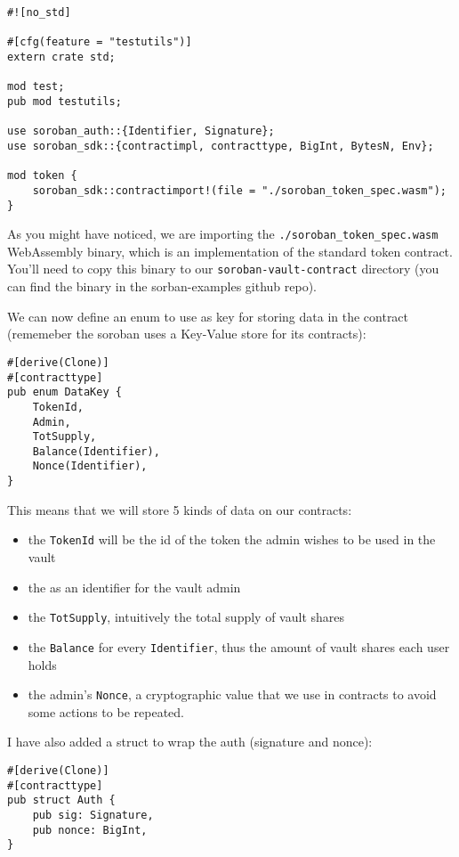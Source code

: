 \documentclass{article}
\newcommand{\inl}[1]{\lstinline{#1}}
\begin{document}
\begin{lstlisting}
#![no_std]

#[cfg(feature = "testutils")]
extern crate std;

mod test;
pub mod testutils;

use soroban_auth::{Identifier, Signature};
use soroban_sdk::{contractimpl, contracttype, BigInt, BytesN, Env};

mod token {
    soroban_sdk::contractimport!(file = "./soroban_token_spec.wasm");
}

\end{lstlisting}

As you might have noticed, we are importing the \inl{./soroban_token_spec.wasm} WebAssembly binary, which is an implementation of the standard token contract. You'll need to copy this binary to our \inl{soroban-vault-contract} directory (you can find the binary in the sorban-examples github repo).

We can now define an enum to use as key for storing data in the contract (rememeber the soroban uses a Key-Value store for its contracts):

\begin{lstlisting}
#[derive(Clone)]
#[contracttype]
pub enum DataKey {
    TokenId,
    Admin,
    TotSupply,
    Balance(Identifier),
    Nonce(Identifier),
}
\end{lstlisting}

This means that we will store 5 kinds of data on our contracts:

\begin{itemize}
\item the \inl{TokenId} will be the id of the token the admin wishes to be used in the vault
\item the  as an identifier for the vault admin
\item the \inl{TotSupply}, intuitively the total supply of vault shares
\item the \inl{Balance} for every \inl{Identifier}, thus the amount of vault shares each user holds
\item the admin's \inl{Nonce}, a cryptographic value that we use in contracts to avoid some actions to be repeated.
\end{itemize}

I have also added a struct to wrap the auth (signature and nonce):

\begin{lstlisting}
#[derive(Clone)]
#[contracttype]
pub struct Auth {
    pub sig: Signature,
    pub nonce: BigInt,
}
\end{lstlisting}
\end{document}
